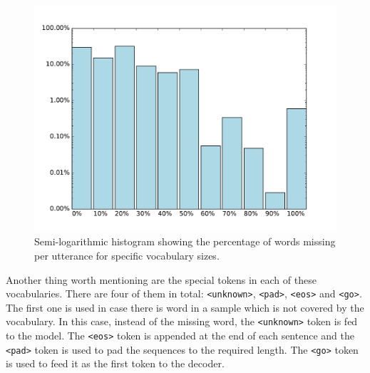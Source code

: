\begin{figure}[H]
	\centering
	\small
	\endminipage\hfill
	\includegraphics[width=\linewidth]{img/opus_vocab_analyze_25k_perc.pdf}
	\centering
	\small
	\endminipage
	\caption{Semi-logarithmic histogram showing the percentage of words missing per utterance for specific vocabulary sizes.}
	\label{fig:data:reddit:vocab:analyze}
\end{figure}

Another thing worth mentioning are the special tokens in each of these vocabularies. There are four of them in total: \texttt{<unknown>}, \texttt{<pad>}, \texttt{<eos>} and \texttt{<go>}. The first one is used in case there is word in a sample which is not covered by the vocabulary. In this case, instead of the missing word, the \texttt{<unknown>} token is fed to the model. The \texttt{<eos>} token is appended at the end of each sentence and the \texttt{<pad>} token is used to pad the sequences to the required length. The \texttt{<go>} token is used to feed it as the first token to the decoder.

